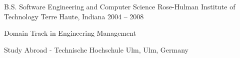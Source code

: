 
\begin{cventries}
  \cveducationentry
  {B.S. Software Engineering and Computer Science}
  {Rose-Hulman Institute of Technology}
  {Terre Haute, Indiana}
  {2004 -- 2008}
  {
    \begin{cvitems}
      \item Domain Track in Engineering Management
      \item Study Abroad - Technische Hochschule Ulm, Ulm, Germany
    \end{cvitems}
  }
\end{cventries}
